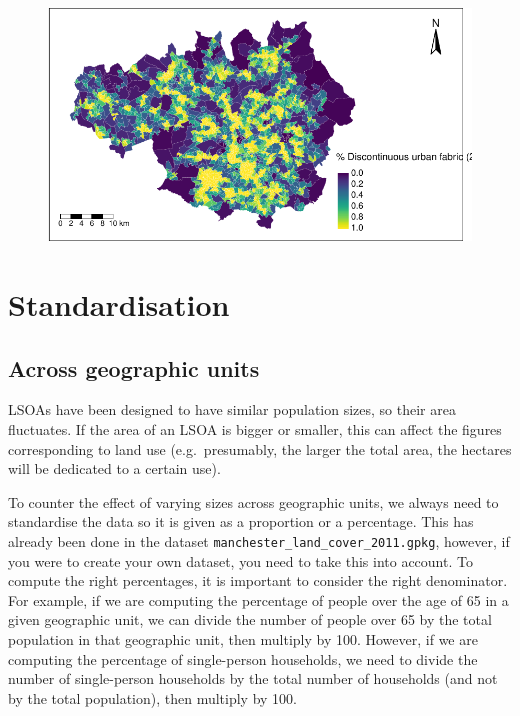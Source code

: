 \documentclass[
  letterpaper,
  DIV=11,
  numbers=noendperiod]{scrreprt}
\begin{document}
\begin{figure}[H]

{\centering \includegraphics{geodemographics_files/figure-pdf/unnamed-chunk-9-1.pdf}

}

\end{figure}

\hypertarget{sec-sec3}{%
\section{Standardisation}\label{sec-sec3}}

\hypertarget{across-geographic-units}{%
\subsection{Across geographic units}\label{across-geographic-units}}

LSOAs have been designed to have similar population sizes, so their area
fluctuates. If the area of an LSOA is bigger or smaller, this can affect
the figures corresponding to land use (e.g.~presumably, the larger the
total area, the hectares will be dedicated to a certain use).

To counter the effect of varying sizes across geographic units, we
always need to standardise the data so it is given as a proportion or a
percentage. This has already been done in the dataset
\texttt{manchester\_land\_cover\_2011.gpkg}, however, if you were to
create your own dataset, you need to take this into account. To compute
the right percentages, it is important to consider the right
denominator. For example, if we are computing the percentage of people
over the age of 65 in a given geographic unit, we can divide the number
of people over 65 by the total population in that geographic unit, then
multiply by 100. However, if we are computing the percentage of
single-person households, we need to divide the number of single-person
households by the total number of households (and not by the total
population), then multiply by 100.
\end{document}

